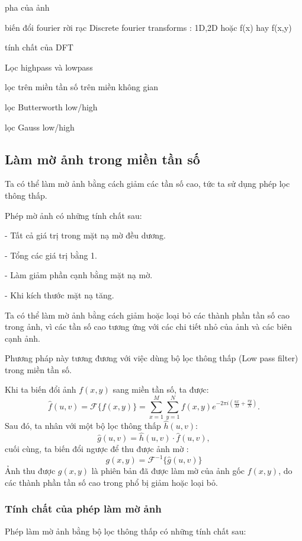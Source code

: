 \documentclass[12pt,a4paper]{report}
\numberwithin{equation}{section}
\theoremstyle{definition} %
\begin{document}
pha của ảnh

biến đổi fourier rời rạc Discrete fourier transforms :  1D,2D hoặc f(x) hay f(x,y)

tính chất của DFT

Lọc highpass và lowpass

lọc trên miền tần số trên miền không gian

lọc Butterworth low/high

lọc Gauss low/high




\subsection{Làm mờ ảnh trong miền tần số}

Ta có thể làm mờ ảnh bằng cách giảm các tần số cao, tức ta sử dụng phép lọc thông thấp.

Phép mờ ảnh có những tính chất sau:

- Tất cả giá trị trong mặt nạ mờ đều dương.

- Tổng các giá trị bằng 1.

- Làm giảm phần cạnh bằng mặt nạ mờ.

- Khi kích thước mặt nạ tăng.

Ta có thể làm mờ ảnh bằng cách giảm hoặc loại bỏ các thành phần tần số cao trong ảnh, vì các tần số cao tương ứng với các chi tiết nhỏ của ảnh và các biên cạnh ảnh.

Phương pháp này tương đương với việc dùng bộ lọc thông thấp (Low pass filter) trong miền tần số.

Khi ta biến đổi ảnh $f(x,y)$ sang miền tần số, ta được: 
\begin{equation}
	\label{141}
	\hat{f}(u,v) = \mathcal{F}\{f(x,y)\} = \sum_{x=1}^{M}\sum_{y=1}^{N} f(x,y)e^{-2\pi i\left(\frac{ux}{M}+\frac{vy}{N}\right)}.
\end{equation}
Sau đó, ta nhân với một bộ lọc thông thấp $\hat{h}(u,v)$: 
\begin{equation}
\label{142}
\hat{g}(u,v) = \hat{h}(u,v)\cdot\hat{f}(u,v),
\end{equation}
cuối cùng, ta biến đổi ngược để thu được ảnh mờ : 
\begin{equation}
\label{143}
g(x,y) = \mathcal{F}^{-1}\{\hat{g}(u,v)\}
\end{equation}
Ảnh thu được $g(x,y)$ là phiên bản đã được làm mờ của ảnh gốc $f(x,y)$, do các thành phần tần số cao trong phổ bị giảm hoặc loại bỏ. 

\subsubsection*{Tính chất của phép làm mờ ảnh}
Phép làm mờ ảnh bằng bộ lọc thông thấp có những tính chất sau:
\end{document}
